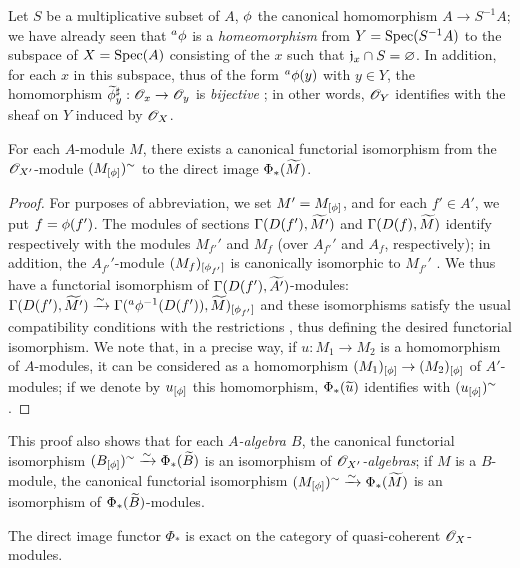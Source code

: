 \begin{exm}[1.6.2]
\label{1.1.6.2}
Let $S$ be a multiplicative subset of $A$, $\phi$ the canonical homomorphism $A\to S^{-1}A$;
we have already seen  that ${}^a\phi$ is a \emph{homeomorphism} from
$Y={\mathop{\mathrm{Spec}}\nolimits}(S^{-1}A)$ to the subspace of $X={\mathop{\mathrm{Spec}}\nolimits}(A)$ consisting of the $x$ such that
$\mathfrak{j}_x\cap S=\varnothing$. In addition, for each $x$ in this subspace, thus of the form
${}^a\phi(y)$ with $y\in Y$, the homomorphism $\widetilde{\phi}_y^\sharp:\mathscr{O}_x\to\mathscr{O}_y$ is
\emph{bijective} ; in other words, $\mathscr{O}_Y$ identifies with the sheaf on $Y$
induced by $\mathscr{O}_X$.
\end{exm}

\begin{prop}[1.6.3]
\label{1.1.6.3}
For each $A$-module $M$, there exists a canonical functorial isomorphism from the
$\mathscr{O}_{X'}$-module $(M_{[\phi]})^\sim$ to the direct image $\Phi_*(\widetilde{M})$.
\end{prop}

\begin{proof}
\label{proof-1.1.6.3}
For purposes of abbreviation, we set $M'=M_{[\phi]}$, and for each $f'\in A'$, we put
$f=\phi(f')$. The modules of sections $\Gamma(D(f'),\widetilde{M'})$ and
$\Gamma(D(f),\widetilde{M})$ identify respectively with the modules $M_{f'}'$ and $M_f$
(over $A_{f'}'$ and $A_f$, respectively); in addition, the $A_{f'}'$-module
$(M_f)_{[\phi_{f'}]}$ is canonically isomorphic to $M_{f'}'$ . We thus have
a functorial isomorphism of $\Gamma(D(f'),\widetilde{A'})$-modules:
$\Gamma(D(f'),\widetilde{M'})
\xrightarrow{\sim}\Gamma({}^a\phi^{-1}(D(f')),\widetilde{M})_{[\phi_{f'}]}$
and these isomorphisms satisfy the usual compatibility conditions with the restrictions
, thus defining the desired functorial isomorphism. We note that, in a
precise way, if $u:M_1\to M_2$ is a homomorphism of $A$-modules, it can be considered as a
homomorphism $(M_1)_{[\phi]}\to(M_2)_{[\phi]}$ of $A'$-modules; if we denote by
$u_{[\phi]}$ this homomorphism, $\Phi_*(\widetilde{u})$ identifies with
$(u_{[\phi]})^\sim$.
\end{proof}

This proof also shows that for each \emph{$A$-algebra $B$}, the canonical functorial
isomorphism
$(B_{[\phi]})^\sim\xrightarrow{\sim}\Phi_*(\widetilde{B})$ is an isomorphism of
\emph{$\mathscr{O}_{X'}$-algebras}; if $M$ is a $B$-module, the canonical functorial isomorphism
$(M_{[\phi]})^\sim\xrightarrow{\sim}\Phi_*(\widetilde{M})$ is an isomorphism of
$\Phi_*(\widetilde{B})$-modules.

\begin{cor}[1.6.4]
\label{1.1.6.4}
The direct image functor $\Phi_*$ is exact on the category of quasi-coherent $\mathscr{O}_X$-modules.
\end{cor}

